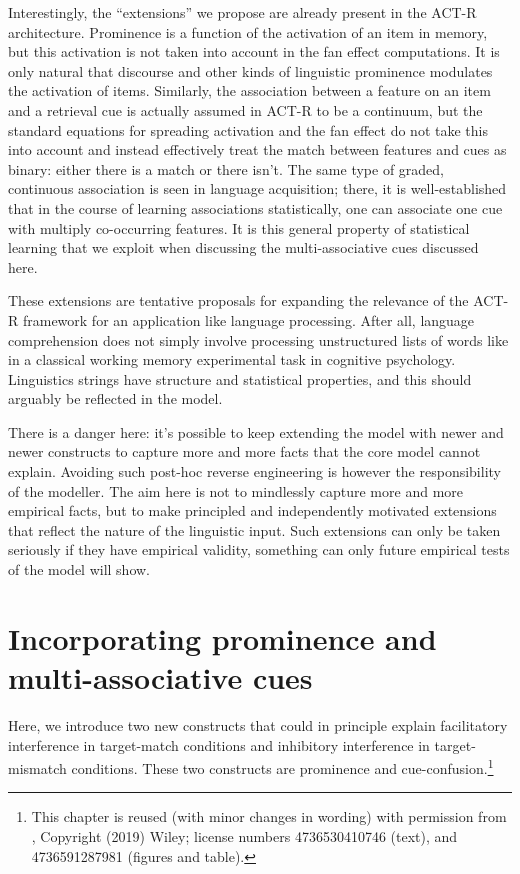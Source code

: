 \documentclass{cambridge7A}\usepackage[]{graphicx}\usepackage[]{color}
\begin{document}
Interestingly, the ``extensions'' we propose are already present in the ACT-R architecture. Prominence is a function of the activation of an item in memory, but this activation is not taken into account in the fan effect computations. It is only natural that discourse and other kinds of linguistic prominence modulates the activation of items. Similarly, the association between a feature on an item and a retrieval cue is actually assumed in ACT-R to be a continuum, but the standard equations for spreading activation and the fan effect do not take this into account and instead effectively treat the match between features and cues as binary: either there is a match or there isn't. The same type of graded, continuous association is seen in language acquisition; there, it is well-established that in the course of learning associations statistically, one can associate one cue with multiply co-occurring features. It is this general property of statistical learning that we exploit when discussing the multi-associative cues discussed here.  

These extensions are tentative proposals for expanding the relevance of the ACT-R framework for an application like language processing. After all, language comprehension does not simply involve processing unstructured lists of words like in a classical working memory experimental task in cognitive psychology. Linguistics strings have structure and statistical properties, and this should arguably be reflected in the model. 

There is a danger here: it's possible to keep extending the model with newer and newer constructs to capture more and more facts that the core model cannot explain. Avoiding such post-hoc reverse engineering is however the responsibility of the modeller. The aim here is not to mindlessly capture more and more empirical facts, but to make principled and independently motivated extensions that reflect the nature of the linguistic input.  Such extensions can only be taken seriously if they have empirical validity, something can only future empirical tests of the model will show.

\section{Incorporating prominence and multi-associative cues}

Here, we introduce two new constructs that could in principle explain facilitatory interference in target-match conditions and inhibitory interference in target-mismatch conditions. These two constructs are  prominence and  cue-confusion.\footnote{This chapter is reused (with minor changes in wording) with permission from \cite{EngelmannJaegerVasishth2019}, Copyright (2019) Wiley; license numbers 4736530410746 (text), and 4736591287981 (figures and table).}
\end{document}
